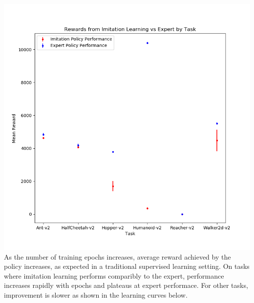 \documentclass{article}
\begin{document}
    \includegraphics[scale=0.7]{imitationExpertComparison}\\

    As the number of training epochs increases, average reward achieved by 
    the policy increases, as expected in a traditional supervised learning 
    setting. On tasks where imitation learning performs comparibly to the 
    expert, performance increases rapidly with epochs and plateaus at expert performace.
    For other tasks, improvement is slower as shown in the learning curves below.
\end{document}
